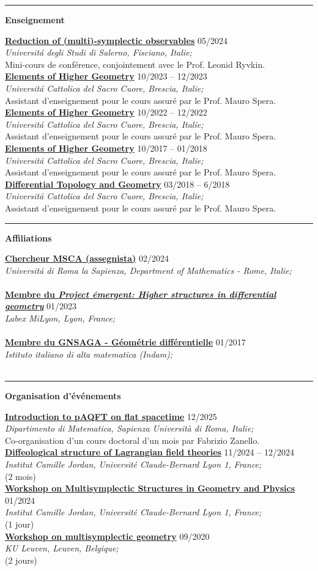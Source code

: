 \documentclass[a4paper]{article}
\newcommand{\block}[1]{\hrule \vspace{0.2cm} \textbf{\Large #1} \vspace{0.2cm}}
\newcommand{\voice}[5]{\href{#4}{\textbf{#1}} \hfill #2 \\ \textit{#3} \\ {\small #5} \vspace{0.2cm} \\}
\begin{document}
	\block{Enseignement}

	\voice{Reduction of (multi)-symplectic observables}
		{05/2024}
		{Universit\'a degli Studi di Salerno, Fisciano, Italie;}
		{https://www.antoniomiti.it/teaching/Obs-Constraint-2024/}
		{Mini-cours de conférence, conjointement avec le Prof. Leonid Ryvkin.}
	\voice{Elements of Higher Geometry}
		{10/2023 -- 12/2023}
		{Universit\'a Cattolica del Sacro Cuore, Brescia, Italie;}
		{https://dmf.unicatt.it/miti/teaching/IstGeoSup-22-23/}
		{Assistant d'enseignement pour le cours assuré par le Prof. Mauro Spera.}
	\voice{Elements of Higher Geometry}
		{10/2022 -- 12/2022}
		{Universit\'a Cattolica del Sacro Cuore, Brescia, Italie;}
		{https://dmf.unicatt.it/miti/teaching/IstGeoSup-22-23/}
		{Assistant d'enseignement pour le cours assuré par le Prof. Mauro Spera.}
	\voice{Elements of Higher Geometry}
		{10/2017 -- 01/2018}
		{Universit\'a Cattolica del Sacro Cuore, Brescia, Italie;}
		{http://docenti.unicatt.it/web/html/index.html\#/programmi/BS/2D9B/75017/2017/21065/MIH341/ita}
		{Assistant d'enseignement pour le cours assuré par le Prof. Mauro Spera.}
	\voice{Differential Topology and Geometry}
		{03/2018 -- 6/2018}
		{Universit\'a Cattolica del Sacro Cuore, Brescia, Italie;}
		{http://docenti.unicatt.it/web/html/index.html\#/programmi/BS/2D8B/75017/2017/21065/MGH344/ita}
		{Assistant d'enseignement pour le cours assuré par le Prof. Mauro Spera.}

	\block{Affiliations}

	\voice{Chercheur MSCA (assegnista)}
		{02/2024}
		{Universit\'a di Roma la Sapienza, Department of Mathematics - Rome, Italie;}
		{https://www.mat.uniroma1.it/persone/miti}
		{\vspace{-0.5cm}}
	\voice{Membre du \emph{Project \'emergent: Higher structures in differential geometry}}
		{01/2023}
		{Labex MiLyon, Lyon, France;}
		{https://www.dropbox.com/s/36kh0vre45r38b2/2301-MiLyon-HigherGeometry.pdf?dl=0}
		{\vspace{-0.5cm}}
	\voice{Membre du GNSAGA - Géométrie différentielle}
		{01/2017}
		{Istituto italiano di alta matematica (Indam);}
		{https://web.archive.org/web/20170924125645/http://www.altamatematica.it/gnsaga/node/23}
		{\vspace{-0.5cm}}

	\block{Organisation d'événements}


  \voice{Introduction to pAQFT on flat spacetime}
        {12/2025}
        {Dipartimento di Matematica, Sapienza Università di Roma, Italie;}
        {https://www.antoniomiti.it/teaching/aqft-2025/}
        {Co-organisation d'un cours doctoral d'un mois par Fabrizio Zanello.}
	\voice{Diffeological structure of Lagrangian field theories}
		{11/2024 -- 12/2024}
		{Institut Camille Jordan, Université Claude-Bernard Lyon 1, France;}
		{https://www.antoniomiti.it/teaching/LFT-2024/}
		{(2 mois)}
	\voice{Workshop on Multisymplectic Structures in Geometry and Physics}
		{01/2024}
		{Institut Camille Jordan, Université Claude-Bernard Lyon 1, France;}
		{https://math.gmu.edu/~cblacke/lyon.html}
		{(1 jour)}
	\voice{Workshop on multisymplectic geometry}
		{09/2020}
		{KU Leuven, Leuven, Belgique;}
		{https://wis.kuleuven.be/events/multisymplectic}
		{(2 jours)}
\end{document}
